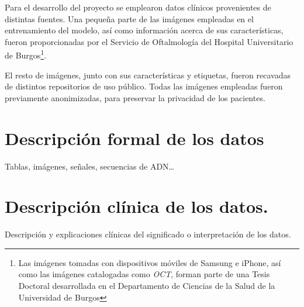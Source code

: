 
Para el desarrollo del proyecto se emplearon datos clínicos provenientes de distintas fuentes. Una pequeña parte de las imágenes empleadas en el entrenamiento del modelo, así como información acerca de sus características, fueron proporcionadas por el Servicio de Oftalmología del Hospital Universitario de Burgos\footnote{Las imágenes tomadas con dispositivos móviles de Samsung e iPhone, así como las imágenes catalogadas como \textit{OCT}, forman parte de una Tesis Doctoral desarrollada en el Departamento de Ciencias de la Salud de la Universidad de Burgos}.

El resto de imágenes, junto con sus características y etiquetas, fueron recavadas de distintos repositorios de uso público. Todas las imágenes empleadas fueron previamente anonimizadas, para preservar la privacidad de los pacientes.

\section{Descripción formal de los datos}

Tablas, imágenes, señales, secuencias de ADN…
    
\section{Descripción clínica de los datos.}

Descripción y explicaciones clínicas del significado o interpretación de los datos.